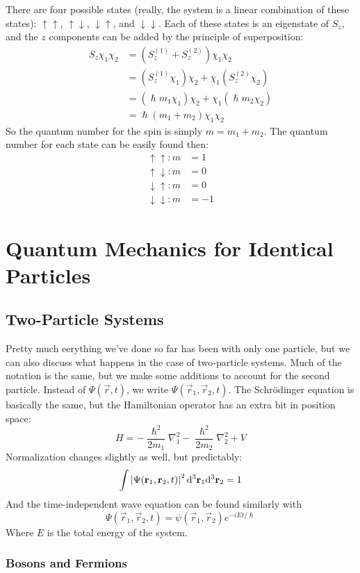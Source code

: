\documentclass[a4paper]{article}
\begin{document}
There are four possible states (really, the system is a linear combination
of these states): $\uparrow\uparrow$, $\uparrow\downarrow$,
$\downarrow\uparrow$, and $\downarrow\downarrow$. Each of these states is an
eigenstate of $S_z$, and the $z$ components can be added by the principle of
superposition:
\begin{align*}
	S_z\chi_1\chi_2 &= (S_z^{(1)}+S_z^{(2)})\chi_1\chi_2\\
			&= (S_z^{(1)}\chi_1)\chi_2+\chi_1(S_z^{(2)}\chi_2)\\
			&= (\hslash m_1\chi_1)\chi_2+\chi_1(\hslash m_2\chi_2)\\
			&= \hslash(m_1+m_2)\chi_1\chi_2
\end{align*}
So the quantum number for the spin is simply $m=m_1+m_2$. The quantum number
for each state can be easily found then:
\begin{align*}
	\uparrow\uparrow: m&=1\\
	\uparrow\downarrow: m&=0\\
	\downarrow\uparrow: m&=0\\
	\downarrow\downarrow: m&=-1
\end{align*}

\section{Quantum Mechanics for Identical Particles}

\subsection{Two-Particle Systems}
Pretty much eerything we've done so far has been with only one particle, but
we can also discuss what happens in the case of two-particle systems. Much
of the notation is the same, but we make some additions to account for the
second particle. Instead of $\Psi(\vec{r},t)$, we write
$\Psi(\vec{r}_1,\vec{r}_2,t)$. The Schr\"odinger equation is basically the
same, but the Hamiltonian operator has an extra bit in position space:
\[ H = -\frac{\hslash^2}{2m_1}\nabla_1^2-\frac{\hslash^2}{2m_2}\nabla_2^2+
V \]
Normalization changes slightly as well, but predictably:
\[ \int\left\lvert \Psi(\boldsymbol{\mathbf{r}}_1,\boldsymbol{\mathbf{r}}_2,t)\right\rvert^2\mathrm{d}^3\boldsymbol{\mathbf{r}}_1\mathrm{d}^3\boldsymbol{\mathbf{r}}_2=1 \]
And the time-independent wave equation can be found similarly with
\[ \Psi(\vec{r}_1,\vec{r}_2,t)=\psi(\vec{r}_1,\vec{r}_2)e^{-iEt/\hslash} \]
Where $E$ is the total energy of the system.

\subsubsection{Bosons and Fermions}
\end{document}
